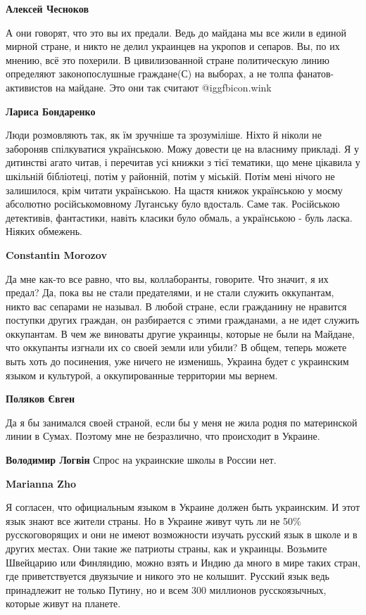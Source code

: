 \begin{itemize}
\begin{itemize}
\textbf{Алексей Чесноков} 

А они говорят, что это вы их предали. Ведь до майдана мы все жили в единой
мирной стране, и никто не делил украинцев на укропов и сепаров. Вы, по их
мнению, всё это похерили. В цивилизованной стране политическую линию определяют
законопослушные граждане(С) на выборах, а не толпа фанатов-активистов на
майдане. Это они так считают @igg{fbicon.wink} 

\textbf{Лариса Бондаренко} 

Люди розмовляють так, як їм зручніше та зрозуміліше. Ніхто й ніколи не
забороняв спілкуватися українською. Можу довести це на власниму прикладі. Я у
дитинстві агато читав, і перечитав усі книжки з тієї тематики, що мене цікавила
у шкільній бібліотеці, потім у районній, потім у міській. Потім мені нічого не
залишилося, крім читати українською. На щастя книжок українською у моєму
абсолютно російськомовному Луганську було вдосталь. Саме так. Російською
детективів, фантастики, навіть класики було обмаль, а українською - буль ласка.
Ніяких обмежень.

\textbf{Constantin Morozov} 

Да мне как-то все равно, что вы, коллаборанты, говорите. Что значит, я их
предал? Да, пока вы не стали предателями, и не стали служить оккупантам, никто
вас сепарами не называл. В любой стране, если гражданину не нравится поступки
других граждан, он разбирается с этими гражданами, а не идет служить
оккупантам. В чем же виноваты другие украинцы, которые не были на Майдане, что
оккупанты изгнали их со своей земли или убили? В общем, теперь можете выть хоть
до посинения, уже ничего не изменишь, Украина будет с украинским языком и
культурой, а оккупированные территории мы вернем.


\textbf{Поляков Євген} 

Да я бы занимался своей страной, если бы у меня не жила родня по материнской
линии в Сумах. Поэтому мне не безразлично, что происходит в Украине.


\textbf{Володимир Логвін} Спрос на украинские школы в России нет.

\textbf{Marianna Zho} 

Я согласен, что официальным языком в Украине должен быть украинским. И этот язык
знают все жители страны. Но в Украине живут чуть ли не 50\% русскоговорящих и они
не имеют возможности изучать русский язык в школе и в других местах. Они такие
же патриоты страны, как и украинцы. Возьмите Швейцарию или Финляндию, можно взять
и Индию да много в мире таких стран, где приветствуется двуязычие и никого это
не колышит. Русский язык ведь принадлежит не только Путину, но и всем 300
миллионов русскоязычных, которые живут на планете.


\end{itemize}
\end{itemize}
